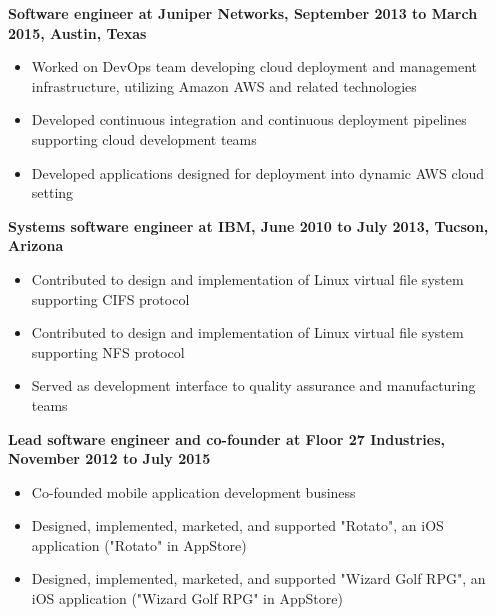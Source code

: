 \documentclass[10pt]{res}
\begin{document}
\begin{resume}
\begin{flushleft}
{\bf Software engineer at Juniper Networks, September 2013 to March 2015, Austin, Texas}
\end{flushleft}

\begin{itemize}
\setlength{\itemsep}{1pt}
\setlength{\parskip}{0pt}
\setlength{\parsep}{0pt}
\item Worked on DevOps team developing cloud deployment and management infrastructure, utilizing Amazon AWS and related technologies
\item Developed continuous integration and continuous deployment pipelines supporting cloud development teams
\item Developed applications designed for deployment into dynamic AWS cloud setting
\end{itemize}

\begin{flushleft}
{\bf Systems software engineer at IBM, June 2010 to July 2013, Tucson, Arizona}
\end{flushleft}

\begin{itemize}
\setlength{\itemsep}{1pt}
\setlength{\parskip}{0pt}
\setlength{\parsep}{0pt}
\item Contributed to design and implementation of Linux virtual file system supporting CIFS protocol
\item Contributed to design and implementation of Linux virtual file system supporting NFS protocol
\item Served as development interface to quality assurance and manufacturing teams
\end{itemize}

\begin{flushleft}
{\bf Lead software engineer and co-founder at Floor 27 Industries, November 2012 to July 2015}
\end{flushleft}

\begin{itemize}
\setlength{\itemsep}{1pt}
\setlength{\parskip}{0pt}
\setlength{\parsep}{0pt}
\item Co-founded mobile application development business
\item Designed, implemented, marketed, and supported "Rotato", an iOS application ("Rotato" in AppStore)
\item Designed, implemented, marketed, and supported "Wizard Golf RPG", an iOS application ("Wizard Golf RPG" in AppStore)
\end{itemize}


\end{resume}
\end{document}
